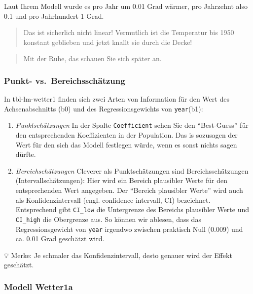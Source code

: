 \documentclass[
  letterpaper,
]{scrbook}
\theoremstyle{definition}
\theoremstyle{definition}
\theoremstyle{definition}
\theoremstyle{remark}
\begin{document}
Laut Ihrem Modell wurde es pro Jahr um 0.01 Grad wärmer, pro Jahrzehnt
also 0.1 und pro Jahrhundert 1 Grad.

\begin{quote}
{} Das ist sicherlich nicht linear! Vermutlich ist die
Temperatur bis 1950 konstant geblieben und jetzt knallt sie durch die
Decke!
\end{quote}

\begin{quote}
{} Mit der Ruhe, das schauen Sie sich später an.
\end{quote}

\subsubsection{Punkt-
vs.~Bereichsschätzung}\label{punkt--vs.-bereichsschuxe4tzung}

In tbl-lm-wetter1 finden sich zwei Arten von Information für den Wert
des Achsenabschnitts (b0) und des Regressionsgewichts von
\texttt{year}(b1):

\begin{enumerate}
\def\labelenumi{\arabic{enumi}.}
\item
  \emph{Punktschätzungen} In der Spalte \texttt{Coefficient} sehen Sie
  den ``Best-Guess'' für den entsprechenden Koeffizienten in der
  Population. Das is sozusagen der Wert für den sich das Modell
  festlegen würde, wenn es sonst nichts sagen dürfte.
\item
  \emph{Bereichschätzungen} Cleverer als Punktschätzungen sind
  Bereichsschätzungen (Intervallschätzungen): Hier wird ein Bereich
  plausibler Werte für den entsprechenden Wert angegeben. Der ``Bereich
  plausibler Werte'' wird auch als Konfidenzintervall (engl. confidence
  intervall, CI) bezeichnet. Entsprechend gibt \texttt{CI\_low} die
  Untergrenze des Bereichs plausibler Werte und \texttt{CI\_high} die
  Obergrenze aus. So können wir ablesen, dass das Regressionsgewicht von
  \texttt{year} irgendwo zwischen praktisch Null (0.009) und ca. 0.01
  Grad geschätzt wird.
\end{enumerate}

💡 Merke: Je schmaler das Konfidenzintervall, desto genauer wird der
Effekt geschätzt.

\subsubsection{Modell Wetter1a}\label{modell-wetter1a}
\end{document}
